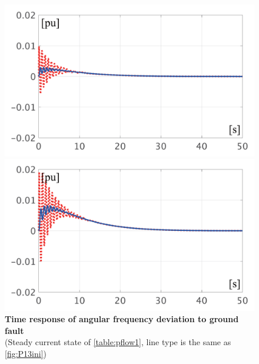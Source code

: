 \documentclass[graybox, envcountchap]{svmult}
\begin{document}
\begin{figure}[t]
  \centering
  {
  \begin{minipage}{0.49\linewidth}
    \centering
    \includegraphics[width = 1.0\linewidth]{figs/50mP1}
  \end{minipage}
  \begin{minipage}{0.49\linewidth}
    \centering
    \includegraphics[width = 1.0\linewidth]{figs/100mP1}
  \end{minipage}
  \medskip
  \caption{\textbf{Time response of angular frequency deviation to ground fault}
  \\ \centering (Steady current state of \ref{table:pflow1}, line type is the same as \ref{fig:P13ini})}
  \label{fig:P1fault}
  }
\medskip
\end{figure}
\end{document}
